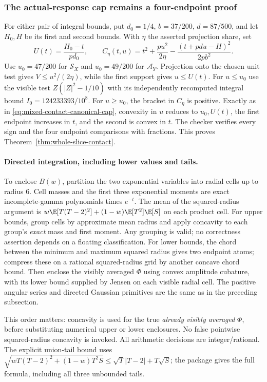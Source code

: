 \subsubsection{The actual-response cap remains a four-endpoint proof}
For either pair of integral bounds, put $d_0=1/4$,
$b=37/200$, $d=87/500$, and let $H_0,H$ be its first and second bounds.
With $\eta$ the asserted projection share, set
\[
 U(t)=\frac{H_0-t}{pd_0},\qquad
 C_\eta(t,u)=t^2+\frac{pu^2}{2\eta}
                 -\frac{(t+pdu-H)^2}{2pb^2}.
\]
Use $u_0=47/200$ for $\mathcal S_X$ and $u_0=49/200$ for
$\mathcal A_Y$. Projection onto the chosen unit test gives
$V\le u^2/(2\eta)$, while the first support gives $u\le U(t)$.
For $u\le u_0$ use the visible test $Z(|Z|^2-1/10)$ with its
independently recomputed integral bound $I_0=124233393/10^8$.
For $u\ge u_0$, the bracket in $C_\eta$ is positive.
Exactly as in \eqref{eq:mixed-contact-canonical-cap}, convexity in $u$
reduces to $u_0,U(t)$, the first endpoint increases in $t$, and the
second is convex in $t$. The checker verifies every sign and the four
endpoint comparisons with fractions. This proves
Theorem~\ref{thm:whole-slice-contact}.

\paragraph{Directed integration, including lower values and tails.}
To enclose $B(w)$, partition the two exponential variables into radial
cells up to radius $6$. Cell masses and the first three exponential
moments are exact incomplete-gamma polynomials times $e^{-t}$.
The mean of the squared-radius argument is
$w\E[T(T-2)^2]+(1-w)\E[T^2]\E[S]$ on each product cell.
For upper bounds, group cells by approximate mean radius and apply
concavity to each group's \emph{exact} mass and first moment.
Any grouping is valid; no correctness assertion depends on a floating
classification. For lower bounds, the chord between the minimum and
maximum squared radius gives two endpoint atoms; compress these on a
rational squared-radius grid by another concave chord bound.
Then enclose the visibly averaged $\Phi$ using convex amplitude
cubature, with its lower bound supplied by Jensen on each visible
radial cell. The positive angular series and directed Gaussian
primitives are the same as in the preceding subsection.

This order matters: concavity is used for the true \emph{already
visibly averaged} $\Phi$, before substituting numerical upper or lower
enclosures. No false pointwise squared-radius concavity is invoked.
All arithmetic decisions are integer/rational. The explicit union-tail
bound uses
$\sqrt{wT(T-2)^2+(1-w)T^2S}\le\sqrt T|T-2|+T\sqrt S$;
the package gives the full formula, including all three unbounded tails.

